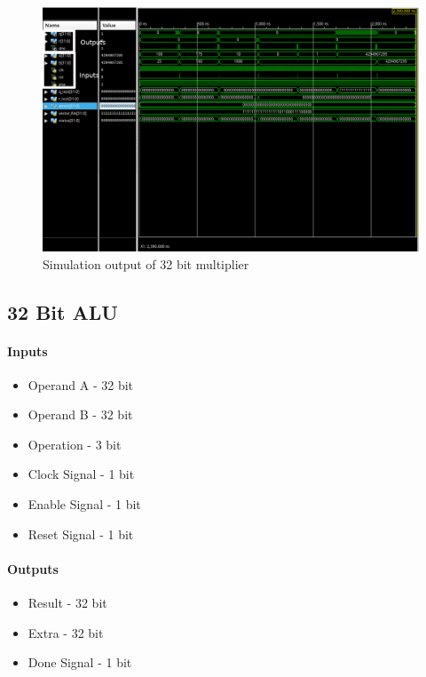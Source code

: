 \documentclass{article}
\begin{document}
    \begin{figure}[H]
        \centering
        \includegraphics[width=0.9\paperwidth,center]{Screenshots/divider_32.png}
        \caption{Simulation output of 32 bit multiplier}
    \end{figure}



    \subsection{32 Bit ALU}

    \paragraph{Inputs}
    \begin{itemize}
        \item Operand A - 32 bit
        \item Operand B - 32 bit
        \item Operation - 3 bit
        \item Clock Signal - 1 bit
        \item Enable Signal - 1 bit
        \item Reset Signal - 1 bit
    \end{itemize}

    \paragraph{Outputs}
    \begin{itemize}
        \item Result - 32 bit
        \item Extra - 32 bit
        \item Done Signal - 1 bit
    \end{itemize}
\end{document}
